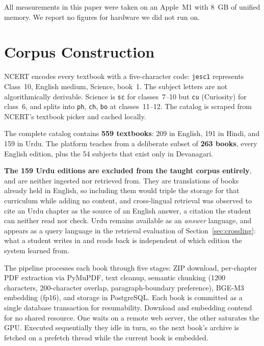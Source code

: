 \fi
All measurements in this paper were taken on an Apple~M1 with 8~GB of unified memory. We report no figures for hardware we did not run on.

\section{Corpus Construction}

NCERT encodes every textbook with a five-character code: \texttt{jesc1} represents Class~10, English medium, Science, book~1. The subject letters are not algorithmically derivable. Science is \texttt{sc} for classes~7--10 but \texttt{cu} (Curiosity) for class~6, and splits into \texttt{ph}, \texttt{ch}, \texttt{bo} at classes~11--12. The catalog is scraped from NCERT's textbook picker and cached locally.

The complete catalog contains \textbf{559 textbooks}: 209 in English, 191 in Hindi, and 159 in Urdu. The platform teaches from a deliberate subset of \textbf{263 books}, every English edition, plus the 54 subjects that exist only in Devanagari.

\ifshort\else  %
\textbf{The 159 Urdu editions are excluded from the taught corpus entirely}, and are neither ingested nor retrieved from. They are translations of books already held in English, so including them would triple the storage for that curriculum while adding no content, and cross-lingual retrieval was observed to cite an Urdu chapter as the source of an English answer, a citation the student can neither read nor check. Urdu remains available as an \emph{answer} language, and appears as a query language in the retrieval evaluation of Section~\ref{sec:crossling}: what a student writes in and reads back is independent of which edition the system learned from.
\fi

The pipeline processes each book through five stages: ZIP download, per-chapter PDF extraction via PyMuPDF, text cleanup, semantic chunking (1200 characters, 200-character overlap, paragraph-boundary preference), BGE-M3 embedding (fp16), and storage in PostgreSQL. Each book is committed as a single database transaction for resumability. Download and embedding contend for no shared resource. One waits on a remote web server, the other saturates the GPU. Executed sequentially they idle in turn, so the next book's archive is fetched on a prefetch thread while the current book is embedded.

